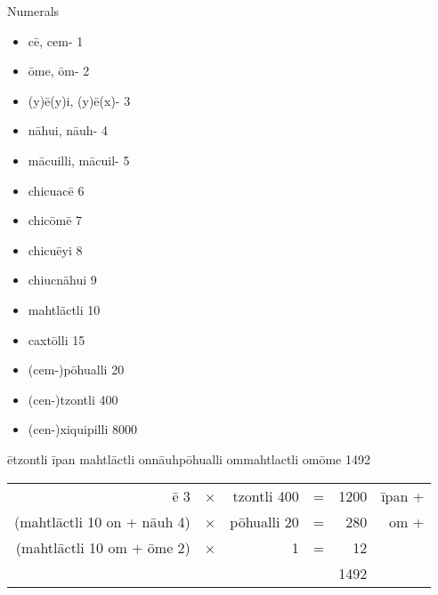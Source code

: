 \documentclass[12pt]{beamer}
\newcommand{\nah}[1]{\textcolor{nahgrn}{#1}}
\newcommand{\trs}[1]{\textcolor{nahblu}{#1}}
\begin{document}
\begin{frame}
\begin{columns}[t]
\begin{column}{.26\linewidth}
      \begin{block}{Numerals}
        \begin{multicols}{2}
          \begin{itemize}
            \item \nah{cē}, \nah{cem-} \trs{1}
            \item \nah{ōme}, \nah{ōm-} \trs{2}
            \item \nah{(y)ē(y)i}, \nah{(y)ē(x)-} \trs{3}
            \item \nah{nāhui}, \nah{nāuh-} \trs{4}
            \item \nah{mācuilli}, \nah{mācuil-} \trs{5}
            \item \nah{chicuacē} \trs{6}
            \item \nah{chicōmē} \trs{7}
            \item \nah{chicuēyi} \trs{8}
            \item \nah{chiucnāhui} \trs{9}
            \item \nah{mahtlāctli} \trs{10}
            \item \nah{caxtōlli} \trs{15}
            \item \nah{(cem-)pōhualli} \trs{20}
            \item \nah{(cen-)tzontli} \trs{400}
            \item \nah{(cen-)xiquipilli} \trs{8000}
          \end{itemize}
        \end{multicols}
      \end{block}
      \begin{example}
        \nah{ētzontli īpan mahtlāctli onnāuhpōhualli ommahtlactli omōme} \trs{1492}
        \begin{center}
          \begin{tabular}{r@{~}c@{~}r@{~}c@{~}r@{~}r}
            \nah{ē} 3                                     & × & \nah{tzontli} 400 & = & 1200 & \nah{īpan} + \\
            (\nah{mahtlāctli} 10 \nah{on} + \nah{nāuh} 4) & × & \nah{pōhualli} 20 & = & 280  & \nah{om} +   \\
            (\nah{mahtlāctli} 10 \nah{om} + \nah{ōme} 2)  & × & 1                 & = & 12   &              \\\hline
                                                          &   &                   &   & 1492 &              \\
          \end{tabular}
        \end{center}
      \end{example}
    \end{column}


\end{columns}
\end{frame}
\end{document}
